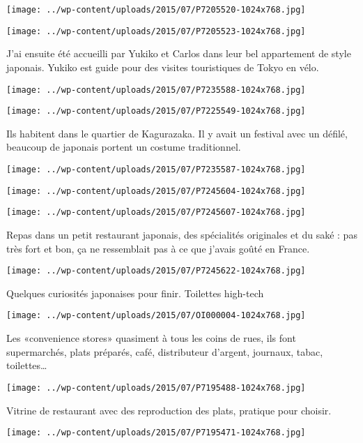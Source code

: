  \newline
\centerline{\texttt{[image: ../wp-content/uploads/2015/07/P7205520-1024x768.jpg]} } 
 \newline
 \newline
\centerline{\texttt{[image: ../wp-content/uploads/2015/07/P7205523-1024x768.jpg]} } 
 \newline
 J'ai ensuite été accueilli par Yukiko et Carlos dans leur bel appartement de style japonais. Yukiko est guide pour des visites touristiques de Tokyo en vélo. \newline
 \newline
\centerline{\texttt{[image: ../wp-content/uploads/2015/07/P7235588-1024x768.jpg]} } 
 \newline
 \newline
\centerline{\texttt{[image: ../wp-content/uploads/2015/07/P7225549-1024x768.jpg]} } 
 \newline
 Ils habitent dans le quartier de Kagurazaka. Il y avait un festival avec un défilé, beaucoup de japonais portent un costume traditionnel. \newline
 \newline
\centerline{\texttt{[image: ../wp-content/uploads/2015/07/P7235587-1024x768.jpg]} } 
 \newline
 \newline
\centerline{\texttt{[image: ../wp-content/uploads/2015/07/P7245604-1024x768.jpg]} } 
 \newline
 \newline
\centerline{\texttt{[image: ../wp-content/uploads/2015/07/P7245607-1024x768.jpg]} } 
 \newline
 Repas dans un petit restaurant japonais, des spécialités originales et du saké : pas très fort et bon, ça ne ressemblait pas à ce que j'avais goûté en France. \newline
 \newline
\centerline{\texttt{[image: ../wp-content/uploads/2015/07/P7245622-1024x768.jpg]} } 
 \newline
 Quelques curiosités japonaises pour finir. \newline
 Toilettes high-tech \newline
 \newline
\centerline{\texttt{[image: ../wp-content/uploads/2015/07/OI000004-1024x768.jpg]} } 
 \newline
 Les «convenience stores» quasiment à tous les coins de rues, ils font supermarchés, plats préparés, café, distributeur d'argent, journaux, tabac, toilettes… \newline
 \newline
\centerline{\texttt{[image: ../wp-content/uploads/2015/07/P7195488-1024x768.jpg]} } 
 \newline
 Vitrine de restaurant avec des reproduction des plats, pratique pour choisir. \newline
 \newline
\centerline{\texttt{[image: ../wp-content/uploads/2015/07/P7195471-1024x768.jpg]} } 
 \newline

\newpage
 
